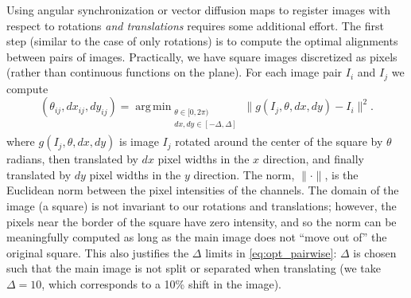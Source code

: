 \documentclass[12pt]{article}
\DeclareMathOperator*{\argmin}{arg\,min}
\begin{document}
Using angular synchronization or vector diffusion maps to register images with respect to rotations {\it and translations} requires some additional effort.
%
%
%
The first step (similar to the case of only rotations) is to compute the optimal alignments between pairs of images.
%
Practically, we have square images discretized as pixels (rather than continuous functions on the plane).
%
For each image pair $I_i$ and $I_j$ we compute
\begin{equation}\label{eq:opt_pairwise}
(\theta_{ij}, dx_{ij}, dy_{ij}) = \argmin_{
\begin{matrix}
\theta \in [0, 2\pi) \\
dx, dy \in [-\Delta, \Delta]\\
\end{matrix}
} \|g(I_j, \theta, dx, dy) - I_i \|^2.
\end{equation}
where $g(I_j, \theta, dx, dy)$ is image $I_j$ rotated around the center of the square by $\theta$ radians, then translated by $dx$ pixel widths in the $x$ direction, and finally translated by $dy$ pixel widths in the $y$ direction.
%
The norm, $\| \cdot \|$, is the Euclidean norm between the pixel intensities of the channels. 
%
The domain of the image (a square) is not invariant to our rotations and translations; however, the pixels near the border of the square have zero intensity, and so the norm can be meaningfully computed as long as the main image does not ``move out of'' the original square.
%
%
This also justifies the $\Delta$ limits in \eqref{eq:opt_pairwise}: $\Delta$ is chosen such that the main image is not split or separated when translating (we take $\Delta=10$, which corresponds to a 10\% shift in the image). 
\end{document}
